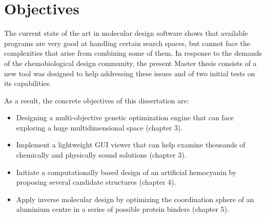 \chapter{Objectives}%


The current state of the art in molecular design software shows that available programs are very good at handling certain search spaces, but cannot face the complexities that arise from combining some of them.
In response to the demands of the chemobiological design community, the present Master thesis consists of a new tool was designed to help addressing these issues and of two initial tests on its capabilities.

As a result, the concrete objectives of this dissertation are:
%
\begin{itemize}

\item Designing a multi-objective genetic optimization engine that can face exploring a huge multidimensional space (chapter 3).

\item Implement a lightweight GUI viewer that can help examine thousands of chemically and physically sound solutions (chapter 3).

\item Initiate a computationally based design of an artificial hemocyanin by proposing several candidate structures (chapter 4).

\item Apply inverse molecular design by optimizing the coordination sphere of an aluminium centre in a series of possible protein binders (chapter 5).

\end{itemize}

